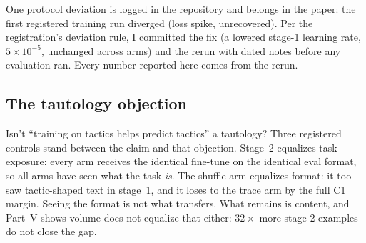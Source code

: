 One protocol deviation is logged in the repository and belongs in the paper: the first registered training run diverged (loss spike, unrecovered). Per the registration's deviation rule, I committed the fix (a lowered stage-1 learning rate, $5\!\times\!10^{-5}$, unchanged across arms) and the rerun with dated notes before any evaluation ran. Every number reported here comes from the rerun.

\subsection{The tautology objection}

Isn't ``training on tactics helps predict tactics'' a tautology? Three registered controls stand between the claim and that objection. Stage~2 equalizes task exposure: every arm receives the identical fine-tune on the identical eval format, so all arms have seen what the task \emph{is}. The shuffle arm equalizes format: it too saw tactic-shaped text in stage~1, and it loses to the trace arm by the full C1 margin. Seeing the format is not what transfers. What remains is content, and Part~V shows volume does not equalize that either: $32\times$ more stage-2 examples do not close the gap.

